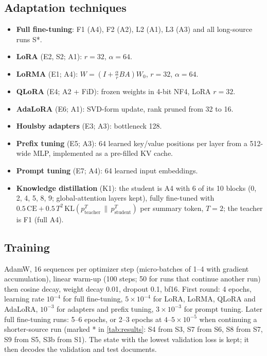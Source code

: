 \documentclass[11pt,a4paper]{article}
\begin{document}
\subsection{Adaptation techniques}
\begin{itemize}
  \item \textbf{Full fine-tuning}: F1 (A4), F2 (A2), L2 (A1), L3 (A3) and all long-source runs S*.
  \item \textbf{LoRA} \cite{hu2022lora} (E2, S2; A1): $r=32$, $\alpha=64$.
  \item \textbf{LoRMA} \cite{bihany2025lorma} (E1; A4): $W=(I+\tfrac{\alpha}{r}BA)W_0$, $r=32$, $\alpha=64$.
  \item \textbf{QLoRA} \cite{dettmers2023qlora} (E4; A2 + FiD): frozen weights in 4-bit NF4, LoRA $r=32$.
  \item \textbf{AdaLoRA} \cite{zhang2023adalora} (E6; A1): SVD-form update, rank pruned from 32 to 16.
  \item \textbf{Houlsby adapters} \cite{houlsby2019adapters} (E3; A3): bottleneck 128.
  \item \textbf{Prefix tuning} \cite{li2021prefix} (E5; A3): 64 learned key/value positions per layer from a
  512-wide MLP, implemented as a pre-filled KV cache.
  \item \textbf{Prompt tuning} \cite{lester2021prompt} (E7; A4): 64 learned input embeddings.
  \item \textbf{Knowledge distillation} \cite{hinton2015kd} (K1): the student is A4 with 6 of its 10 blocks
  (0, 2, 4, 5, 8, 9; global-attention layers kept), fully fine-tuned with
  $0.5\,\mathrm{CE} + 0.5\,T^2\,\mathrm{KL}(p^T_\text{teacher}\,\|\,p^T_\text{student})$ per summary token, $T=2$;
  the teacher is F1 (full A4).
\end{itemize}

\subsection{Training}
AdamW, 16 sequences per optimizer step (micro-batches of 1--4 with gradient accumulation), linear warm-up
(100 steps; 50 for runs that continue another run) then cosine decay, weight decay 0.01, dropout 0.1, bf16.
First round: 4 epochs, learning rate $10^{-4}$ for full fine-tuning, $5\times10^{-4}$ for LoRA, LoRMA, QLoRA and
AdaLoRA, $10^{-3}$ for adapters and prefix tuning, $3\times10^{-3}$ for prompt tuning.  Later full fine-tuning
runs: 5--6 epochs, or 2--3 epochs at $4$--$5\times10^{-5}$ when continuing a shorter-source run (marked * in
\autoref{tab:results}: S4 from S3, S7 from S6, S8 from S7, S9 from S5, S3b from S1).  The state with the lowest
validation loss is kept; it then decodes the validation and test documents.
\end{document}
